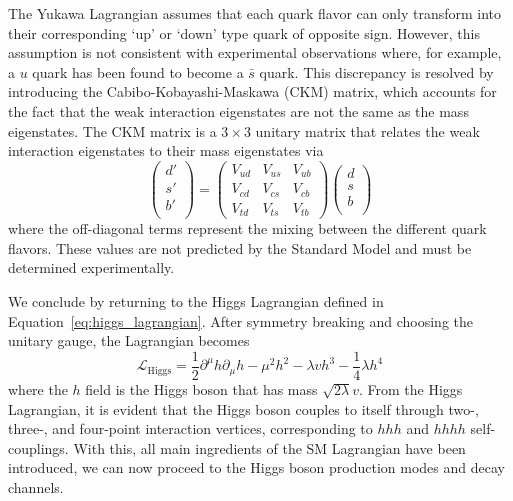 The Yukawa Lagrangian assumes that each quark flavor can only transform into their corresponding `up' or `down' type quark of opposite sign. However, this assumption is not consistent with experimental observations where, for example, a $u$ quark has been found to become a $\bar{s}$ quark. This discrepancy is resolved by introducing the Cabibo-Kobayashi-Maskawa (CKM) matrix, which accounts for the fact that the weak interaction eigenstates are not the same as the mass eigenstates. The CKM matrix is a $3\times3$ unitary matrix that relates the weak interaction eigenstates to their mass eigenstates via
\begin{equation}
  \begin{pmatrix}
    d' \\
    s' \\
    b' \\
  \end{pmatrix}
  = \begin{pmatrix}
    V_{ud} & V_{us} & V_{ub} \\
    V_{cd} & V_{cs} & V_{cb} \\
    V_{td} & V_{ts} & V_{tb}
  \end{pmatrix}
  \begin{pmatrix}
    d \\
    s \\
    b \\
  \end{pmatrix}
  \label{eq:ckm_matrix}
\end{equation}
where the off-diagonal terms represent the mixing between the different quark flavors. These values are not predicted by the Standard Model and must be determined experimentally. 

We conclude by returning to the Higgs Lagrangian defined in Equation~\ref{eq:higgs_lagrangian}. After symmetry breaking and choosing the unitary gauge, the Lagrangian becomes
\begin{equation}
  \mathcal{L}_{\mathrm{Higgs}} = \frac{1}{2}\partial^{\mu}h\partial_{\mu}h - \mu^{2}h^{2} - \lambda v h^{3} - \frac{1}{4}\lambda h^{4}
\end{equation}
where the $h$ field is the Higgs boson that has mass $\sqrt{2\lambda}v$. From the Higgs Lagrangian, it is evident that the Higgs boson couples to itself through two-, three-, and four-point interaction vertices, corresponding to $hhh$ and $hhhh$ self-couplings. With this, all main ingredients of the SM Lagrangian have been introduced, we can now proceed to the Higgs boson production modes and decay channels.